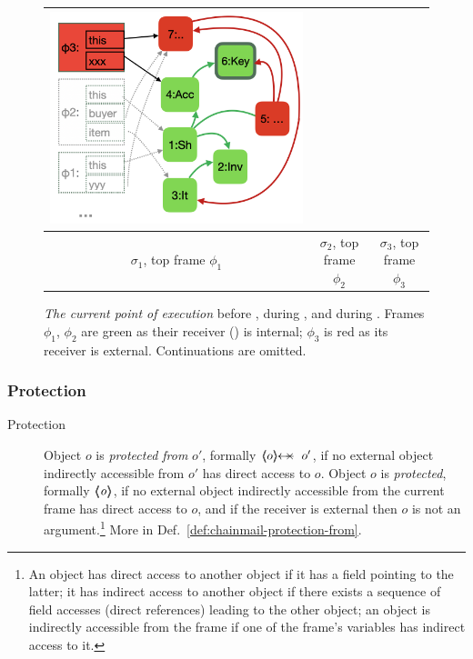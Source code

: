 \begin{figure}[th]
\begin{tabular}{|c|c|c|}
{\includegraphics[width=\linewidth]{diagrams/ShopD.png}
}
\\
\hline
$\sigma_1$, top frame $\phi_1$  %
&
$\sigma_2$, top frame $\phi_2$ 
&
$\sigma_3$, top frame $\phi_3$ 
\\
\hline %
\end{tabular}
\caption{\textit{The current point of execution} before , during , and during .  Frames $\phi_1$, $\phi_2$ are green  as their receiver () is internal;  $\phi_3$ is red as its receiver is external. Continuations are omitted.}
 \label{f:CurrentPoint}
 \end{figure}


\subsubsection{Protection}
\label{sect:approach:protection}


 \begin{description}
\item[Protection] 
Object $o$ is \emph{protected  from} $o'$, formally $\protectedFrom {o} {o'}$,  
if no external object indirectly accessible from $o'$ has direct access to $o$.
Object $o$ is \emph{protected}, formally ${\langle\!\!\langle \mbox{\normalfont{\texttt{\it{o}}}} \rangle\!\!\rangle}$,  
if no external object indirectly accessible from the current frame has direct access to $o$,
 and  if the receiver is external then $o$ is not an argument.\footnote{An object has direct access to another object if it has a field pointing to the latter;
 it has indirect access to another object if there exists a sequence of field accesses (direct references) leading to the other object; 
 an object is indirectly accessible from the frame if one of the frame's variables has indirect access to it.} 
 More in Def.\ \ref{def:chainmail-protection-from}. %
\end{description}
 
